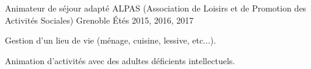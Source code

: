 \begin{cventries}
\cventry
{Animateur de séjour adapté} %
{ALPAS (Association de Loisirs et de Promotion des Activités Sociales)} %
{Grenoble} %
{Étés 2015, 2016, 2017} %
{ %
\begin{cvitems}
\item Gestion d'un lieu de vie (ménage, cuisine, lessive, etc...).
\item Animation d'activités avec des adultes déficients intellectuels.
\end{cvitems}
}


\end{cventries}